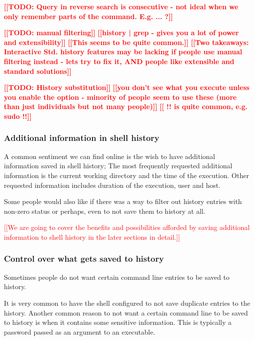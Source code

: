 \documentclass[thesis=M,english]{FITthesis}[2012/10/20]
\newcommand{\todotext}[1]{\textcolor{red}{\textbf{[[#1]]}}}
\newcommand{\redtext}[1]{\textcolor{red}{[[#1]]}}
\begin{document}

\todotext{TODO: Query in reverse search is consecutive - not ideal when we only remember parts of the command. E.g. ... ?}

\todotext{TODO: manual filtering}
\todotext{history | grep - gives you a lot of power and extensibility}
\todotext{This seems to be quite common.}
\todotext{Two takeaways: Interactive Std. history features may be lacking if people use manual filtering instead - lets try to fix it, AND people like extensible and standard solutions}


\todotext{TODO: History substitution}
\todotext{you don't see what you execute unless you enable the option - minority of people seem to use these (more than just individuals but not many people)}
\todotext{ !! is quite common, e.g. sudo !!}



\subsubsection*{Additional information in shell history}

A common sentiment we can find online is the wish to have additional information saved in shell history; The most frequently requested additional information is the current working directory and the time of the execution. Other requested information includes duration of the execution, user and host. 

Some people would also like if there was a way to filter out history entries with non-zero status or perhaps, even to not save them to history at all.

\redtext{We are going to cover the benefits and possibilities afforded by saving additional information to shell history in the later sections in detail.}

\subsubsection*{Control over what gets saved to history}
Sometimes people do not want certain command line entries to be saved to history. 

It is very common to have the shell configured to not save duplicate entries to the history.  
Another common reason to not want a certain command line to be saved to history is when it contains some sensitive information. This is typically a password passed as an argument to an executable.
\end{document}
